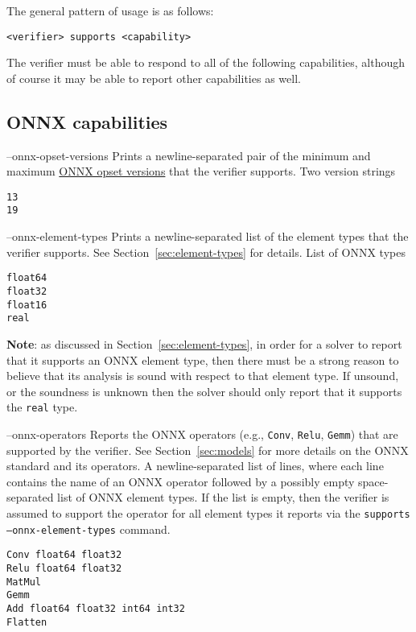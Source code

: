 The general pattern of usage is as follows:
\begin{lstlisting}[style=bash]
<verifier> supports <capability>
\end{lstlisting}
The verifier must be able to respond to all of the following capabilities, although of course it may be able to report other capabilities as well.

\subsection{ONNX capabilities}

\clOutputOption
{--onnx-opset-versions}
{Prints a newline-separated pair of the minimum and maximum \href{https://onnxruntime.ai/docs/reference/compatibility.html\#onnx-opset-support}{ONNX opset versions} that the verifier supports.}
{Two version strings}
\begin{lstlisting}[style=bash]
%*\exampleVerifier* supports --onnx-opset-versions
13
19
\end{lstlisting}

\clOutputOption
{--onnx-element-types}
{Prints a newline-separated list of the element types that the verifier supports. See Section~\ref{sec:element-types} for details.}
{List of ONNX types}
\begin{lstlisting}[style=bash]
%*\exampleVerifier* supports --onnx-element-types
float64
float32
float16
real
\end{lstlisting}
\textbf{Note}: as discussed in Section~\ref{sec:element-types}, in order for a solver to report that it supports an ONNX element type, then there must be a strong reason to believe that its analysis is sound with respect to that element type. If unsound, or the soundness is unknown then the solver should only report that it supports the \texttt{real} type.

\clOutputOption
{--onnx-operators}
{Reports the ONNX operators (e.g., \texttt{Conv}, \texttt{Relu}, \texttt{Gemm}) that are supported by the verifier. See Section~\ref{sec:models} for more details on the ONNX standard and its operators. 
}
{A newline-separated list of lines, where each line contains the name of an ONNX operator followed by a possibly empty space-separated list of ONNX element types. If the list is empty, then the verifier is assumed to support the operator for all element types it reports via the \texttt{supports --onnx-element-types} command.
}
\begin{lstlisting}[style=bash]
%*\exampleVerifier* supports --onnx-operators
Conv float64 float32
Relu float64 float32
MatMul
Gemm
Add float64 float32 int64 int32
Flatten
\end{lstlisting}

